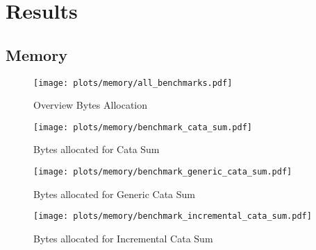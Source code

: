 \section{Results}

\subsection{Memory}
\begin{figure}[H]
    \centering
    \texttt{[image: plots/memory/all\_benchmarks.pdf]}
    \caption{Overview Bytes Allocation}
    \label{fig-bytes-all-overview}
\end{figure}

\begin{figure}[H]
    \centering
    \texttt{[image: plots/memory/benchmark\_cata\_sum.pdf]}
    \caption{Bytes allocated for Cata Sum}
    \label{fig-bytes-all-cata-sum}
\end{figure}

\begin{figure}[H]
    \centering
    \texttt{[image: plots/memory/benchmark\_generic\_cata\_sum.pdf]}
    \caption{Bytes allocated for Generic Cata Sum}
    \label{fig-bytes-all-gen-cata-sum}
\end{figure}

\begin{figure}[H]
    \centering
    \texttt{[image: plots/memory/benchmark\_incremental\_cata\_sum.pdf]}
    \caption{Bytes allocated for Incremental Cata Sum}
    \label{fig-bytes-all-inc-cata-sum}
\end{figure}